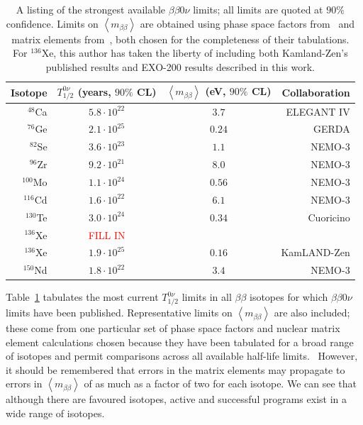 \begin{table}
\begin{center}
\begin{tabular}{|rccr|}
\hline Isotope & $T_{1/2}^{0\nu}$ (years, $90\%$ CL) & $\left<m_{\beta\beta}\right>$ (eV, $90\%$ CL) & Collaboration \\ \hline
$^{48}$Ca & $5.8 \cdot 10^{22}$ & $3.7$ & ELEGANT IV \cite{ElegantIV}\\
$^{76}$Ge & $2.1 \cdot 10^{25}$ & $0.24$ & GERDA \cite{PhysRevLett.111.122503} \\
$^{82}$Se & $3.6 \cdot 10^{23}$ & $1.1$ & NEMO-3 \cite{NEMO2011RandomOtherIsotopes}\\
$^{96}$Zr & $9.2 \cdot 10^{21}$ & $8.0$ & NEMO-3 \cite{Argyriades2010168}\\
$^{100}$Mo & $1.1 \cdot 10^{24}$ & $0.56$ & NEMO-3 \cite{NEMO3-2013-100Mo}\\
$^{116}$Cd & $1.6 \cdot 10^{22}$ & $6.1$ & NEMO-3 \cite{NEMO2011RandomOtherIsotopes}\\
$^{130}$Te & $3.0 \cdot 10^{24}$ & $0.34$ & Cuoricino \cite{PhysRevC.78.035502}\\
$^{136}$Xe & \textcolor{red}{FILL IN} & & \\
$^{136}$Xe & $1.9 \cdot 10^{25}$ & $0.16$ & KamLAND-Zen \cite{PhysRevLett.110.062502}\\
$^{150}$Nd & $1.8 \cdot 10^{22}$ & $3.4$ & NEMO-3 \cite{PhysRevC.80.032501}\\
\hline
\end{tabular}
\end{center}
\caption{A listing of the strongest available $\beta\beta 0\nu$ limits; all limits are quoted at $90\%$ confidence.  Limits on $\left<m_{\beta\beta}\right>$ are obtained using phase space factors from~\cite{PhysRevC.85.034316} and matrix elements from~\cite{PhysRevLett.109.042501}, both chosen for the completeness of their tabulations.  For $^{136}$Xe, this author has taken the liberty of including both Kamland-Zen's published results and EXO-200 results described in this work.}
\label{tab:0nubb_limits}
\end{table}

Table~\ref{tab:0nubb_limits} tabulates the most current $T_{1/2}^{0\nu}$ limits in all $\beta\beta$ isotopes for which $\beta\beta 0\nu$ limits have been published.  Representative limits on $\left< m_{\beta\beta}\right>$ are also included; these come from one particular set of phase space factors and nuclear matrix element calculations chosen because they have been tabulated for a broad range of isotopes and permit comparisons across all available half-life limits.~\cite{PhysRevC.85.034316}\cite{PhysRevLett.109.042501}  However, it should be remembered that errors in the matrix elements may propagate to errors in $\left< m_{\beta\beta}\right>$ of as much as a factor of two for each isotope.  We can see that although there are favoured isotopes, active and successful programs exist in a wide range of isotopes.

